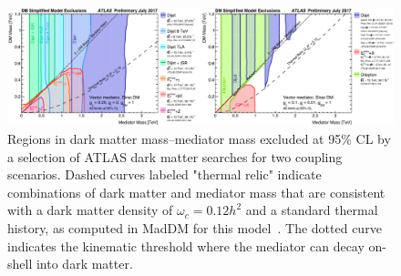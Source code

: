 

\begin{figure}[!htpb]
\includegraphics[width=\textwidth]{figures/SummaryPlotsMassMass.pdf}\caption{
Regions in dark matter mass--\Zprime mediator mass excluded at 95\% CL by a selection of ATLAS dark matter searches for two coupling scenarios. Dashed curves labeled "thermal relic" indicate combinations of dark matter and mediator mass that are consistent with a dark matter density of $\omega_c = 0.12 h^2$ and a standard thermal history, as computed in MadDM for this model~\cite{Backovic:2015cra}. The dotted curve indicates the kinematic threshold where the mediator can decay on-shell into dark matter. }
\label{fig:sensitivityComparison}
\end{figure}


